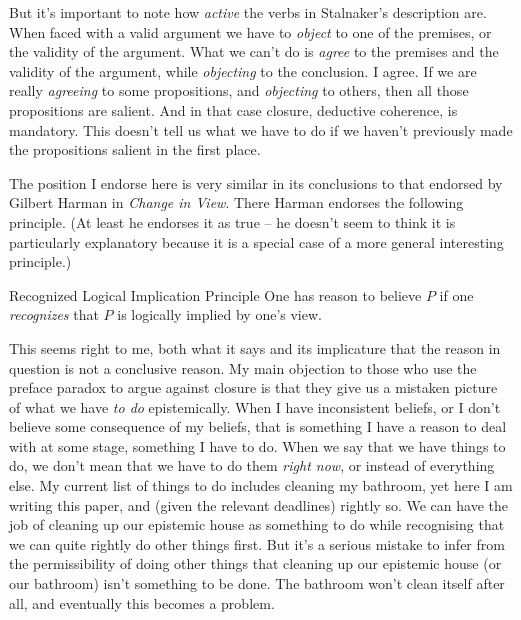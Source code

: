 But it's important to note how \textit{active} the verbs in Stalnaker's description are. When faced with a valid argument we have to \textit{object} to one of the premises, or the validity of the argument. What we can't do is \textit{agree} to the premises and the validity of the argument, while \textit{objecting} to the conclusion. I agree. If we are really \textit{agreeing} to some propositions, and \textit{objecting} to others, then all those propositions are salient. And in that case closure, deductive coherence, is mandatory. This doesn't tell us what we have to do if we haven't previously made the propositions salient in the first place.

The position I endorse here is very similar in its conclusions to that endorsed by Gilbert Harman in \textit{Change in View}. There Harman endorses the following principle. (At least he endorses it as true -- he doesn't seem to think it is particularly explanatory because it is a special case of a more general interesting principle.)

\begin{description*}
\item[Recognized Logical Implication Principle] One has reason to believe \(P\) if one \textit{recognizes} that \(P\) is logically implied by one's view. \cite[17]{Harman1986}
\end{description*}

\noindent This seems right to me, both what it says and its implicature that the reason in question is not a conclusive reason. My main objection to those who use the preface paradox to argue against closure is that they give us a mistaken picture of what we have \textit{to do} epistemically. When I have inconsistent beliefs, or I don't believe some consequence of my beliefs, that is something I have a reason to deal with at some stage, something I have to do. When we say that we have things to do, we don't mean that we have to do them \textit{right now}, or instead of everything else. My current list of things to do includes cleaning my bathroom, yet here I am writing this paper, and (given the relevant deadlines) rightly so. We can have the job of cleaning up our epistemic house as something to do while recognising that we can quite rightly do other things first. But it's a serious mistake to infer from the permissibility of doing other things that cleaning up our epistemic house (or our bathroom) isn't something to be done. The bathroom won't clean itself after all, and eventually this becomes a problem.

